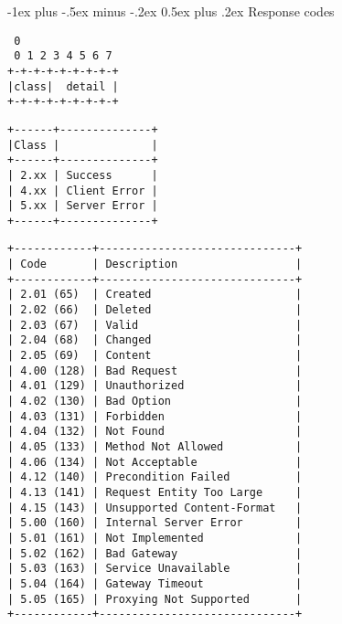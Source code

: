 \documentclass[a4,10pt,landscape]{article}
\makeatletter
\renewcommand{\section}{\@startsection{section}{1}{0mm}%
                                {-1ex plus -.5ex minus -.2ex}%
                                {0.5ex plus .2ex}%
                                {\normalfont\large\bfseries}}
\makeatother
\begin{document}
\begin{multicols}{3}
\section{Response codes}

{\tiny
\begin{verbatim}
 0
 0 1 2 3 4 5 6 7
+-+-+-+-+-+-+-+-+
|class|  detail |
+-+-+-+-+-+-+-+-+
\end{verbatim}
}

{\tiny
\begin{verbatim}
+------+--------------+
|Class |              |
+------+--------------+
| 2.xx | Success      |
| 4.xx | Client Error |
| 5.xx | Server Error |
+------+--------------+
\end{verbatim}
}

{\tiny
\begin{verbatim}
+------------+------------------------------+
| Code       | Description                  |
+------------+------------------------------+
| 2.01 (65)  | Created                      |
| 2.02 (66)  | Deleted                      |
| 2.03 (67)  | Valid                        |
| 2.04 (68)  | Changed                      |
| 2.05 (69)  | Content                      |
| 4.00 (128) | Bad Request                  |
| 4.01 (129) | Unauthorized                 |
| 4.02 (130) | Bad Option                   |
| 4.03 (131) | Forbidden                    |
| 4.04 (132) | Not Found                    |
| 4.05 (133) | Method Not Allowed           |
| 4.06 (134) | Not Acceptable               |
| 4.12 (140) | Precondition Failed          |
| 4.13 (141) | Request Entity Too Large     |
| 4.15 (143) | Unsupported Content-Format   |
| 5.00 (160) | Internal Server Error        |
| 5.01 (161) | Not Implemented              |
| 5.02 (162) | Bad Gateway                  |
| 5.03 (163) | Service Unavailable          |
| 5.04 (164) | Gateway Timeout              |
| 5.05 (165) | Proxying Not Supported       |
+------------+------------------------------+
\end{verbatim}
}


\end{multicols}
\end{document}
